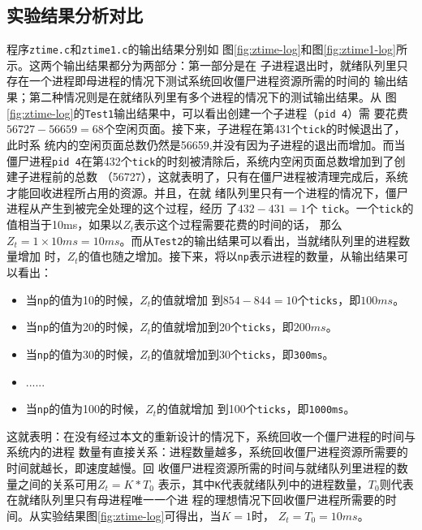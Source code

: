 \documentclass{swfuthesism}
\begin{document}
\subsection{实验结果分析对比}

程序\texttt{ztime.c}和\texttt{ztime1.c}的输出结果分别如
图\ref{fig:ztime-log}和图\ref{fig:ztime1-log}所示。这两个输出结果都分为两部分：第一部分是在
子进程退出时，就绪队列里只存在一个进程即母进程的情况下测试系统回收僵尸进程资源所需的时间的
输出结果；第二种情况则是在就绪队列里有多个进程的情况下的测试输出结果。从
图\ref{fig:ztime-log}的\texttt{Test1}输出结果中，可以看出创建一个子进程（\texttt{pid 4}）需
要花费$56727-56659=68$个空闲页面。接下来，子进程在第431个\texttt{tick}的时候退出了，此时系
统内的空闲页面总数仍然是56659,并没有因为子进程的退出而增加。而当僵尸进程\texttt{pid
  4}在第432个\texttt{tick}的时刻被清除后，系统内空闲页面总数增加到了创建子进程前的总数
（56727），这就表明了，只有在僵尸进程被清理完成后，系统才能回收进程所占用的资源。并且，在就
绪队列里只有一个进程的情况下，僵尸进程从产生到被完全处理的这个过程，经历
了$432-431=1$个
\texttt{tick}。一个\texttt{tick}的值相当于10ms，如果以$Z_t$表示这个过程需要花费的时间的话，
那么$Z_t=1×10ms=10ms$。而从\texttt{Test2}的输出结果可以看出，当就绪队列里的进程数量增加
时，$Z_t$的值也随之增加。接下来，将以\texttt{np}表示进程的数量，从输出结果可以看出：
\begin{itemize}
\item 当\texttt{np}的值为10的时候，$Z_t$的值就增加
  到$854-844=10$个\texttt{ticks}，即$100ms$。
\item 当\texttt{np}的值为20的时候，$Z_t$的值就增加到20个\texttt{ticks}，即$200ms$。
\item 当\texttt{np}的值为30的时候，$Z_t$的值就增加到30个\texttt{ticks}，即\texttt{300ms}。
\item ......
\item 当\texttt{np}的值为100的时候，$Z_t$的值就增加
  到100个\texttt{ticks}，即\texttt{1000ms}。
\end{itemize}

这就表明：在没有经过本文的重新设计的情况下，系统回收一个僵尸进程的时间与系统内的进程
数量有直接关系：进程数量越多，系统回收僵尸进程资源所需要的时间就越长，即速度越慢。回
收僵尸进程资源所需的时间与就绪队列里进程的数量之间的关系可用$Z_t=K*T_0$ 表示，其中\texttt{K}代表就绪队列中的进程数量，$T_0$则代表在就绪队列里只有母进程唯一一个进
程的理想情况下回收僵尸进程所需要的时间。从实验结果图\ref{fig:ztime-log}可得出，当$K=1$时，
$Z_t=T_0=10ms$。 
\end{document}
